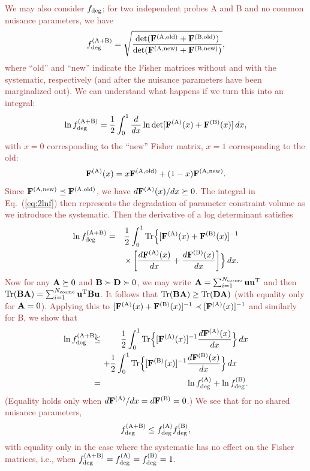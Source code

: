 \documentclass[usenatbib]{mnras}
\newcommand{\changetext}[1]{\textcolor{brown}{#1}}
\begin{document}
\changetext{We may also consider $f_{\rm deg}$; for two independent probes A and B and no common nuisance parameters, we have
\begin{equation}
f_{\rm deg}^{\rm(A+B)} = \sqrt{ \frac{\det ({\bf F}^{\rm(A,old)} + {\bf F}^{\rm(B,old)})}{\det ({\bf F}^{\rm(A,new)} + {\bf F}^{\rm(B,new)})} },
\end{equation}
where ``old'' and ``new'' indicate the Fisher matrices without and with the systematic, respectively (and after the nuisance parameters have been marginalized out). We can understand what happens if we turn this into an integral:
\begin{equation}
\ln f_{\rm deg}^{\rm(A+B)} = \frac12 \int_0^1 \frac{d}{d x} \ln \det[{\bf F}^{\rm(A)}(x) + {\bf F}^{\rm(B)}(x)]\,d x,
\label{eq:2lnf}
\end{equation}
with $x=0$ corresponding to the ``new'' Fisher matrix, $x=1$ corresponding to the old:
\begin{equation}
{\bf F}^{\rm(A)}(x) = x {\bf F}^{\rm(A,old)} + (1-x) {\bf F}^{\rm(A,new)}.
\end{equation}
Since ${\bf F}^{\rm(A,new)}\preceq {\bf F}^{\rm(A,old)}$, we have $d{\bf F}^{\rm(A)}(x)/dx \succeq 0$. The integral in Eq.~(\ref{eq:2lnf}) then represents the degradation of parameter constraint volume as we introduce the systematic. Then the derivative of a log determinant satisfies
\begin{eqnarray}
\ln f_{\rm deg}^{\rm(A+B)} &=& \frac12 \int_0^1 {\rm Tr} \Bigl\{ [{\bf F}^{\rm(A)}(x) + {\bf F}^{\rm(B)}(x)]^{-1}
\nonumber \\ && \times
\left[ \frac{d{\bf F}^{\rm(A)}(x)}{dx} + \frac{d{\bf F}^{\rm(B)}(x)}{dx} \right]
\Bigr\}
\,d x.
\end{eqnarray}
Now for any ${\bf A}\succeq0$ and ${\bf B}\succ {\bf D} \succ 0$, we may write ${\bf A} = \sum_{i=1}^{N_{\rm cosmo}} {\bf uu}^{\rm T}$ and then ${\rm Tr}({\bf BA}) = \sum_{i=1}^{N_{\rm cosmo}} {\bf u}^{\rm T}{\bf Bu}$. It follows that ${\rm Tr}({\bf BA})\ge {\rm Tr}({\bf DA})$ (with equality only for ${\bf A}=0$). Applying this to $[{\bf F}^{\rm(A)}(x) + {\bf F}^{\rm(B)}(x)]^{-1} \prec [{\bf F}^{\rm(A)}(x)]^{-1}$ and similarly for B, we show that
\begin{eqnarray}
\ln f_{\rm deg}^{\rm(A+B)} \!\!\!\! &\le&\!\!\!\! \frac12 \int_0^1 {\rm Tr} \Bigl\{ [{\bf F}^{\rm(A)}(x)]^{-1}\frac{d{\bf F}^{\rm(A)}(x)}{dx} \Bigr\} \,d x
\nonumber \\ &&\!\!\!\!
+ \frac12 \int_0^1 {\rm Tr} \Bigl\{ [{\bf F}^{\rm(B)}(x)]^{-1}\frac{d{\bf F}^{\rm(B)}(x)}{dx} \Bigr\} \,d x~~~~
\nonumber \\
&=& \ln f_{\rm deg}^{\rm(A)} + \ln f_{\rm deg}^{\rm(B)}.
\end{eqnarray}
(Equality holds only when $d{\bf F}^{\rm(A)}/dx = d{\bf F}^{\rm(B)}=0$.) We see that for no shared nuisance parameters,
\begin{equation}
f_{\rm deg}^{\rm(A+B)} \le f_{\rm deg}^{\rm(A)} f_{\rm deg}^{\rm(B)},
\end{equation}
with equality only in the case where the systematic has no effect on the Fisher matrices, i.e., when $f_{\rm deg}^{\rm(A+B)} = f_{\rm deg}^{\rm(A)} = f_{\rm deg}^{\rm(B)} = 1$.
}
\end{document}

